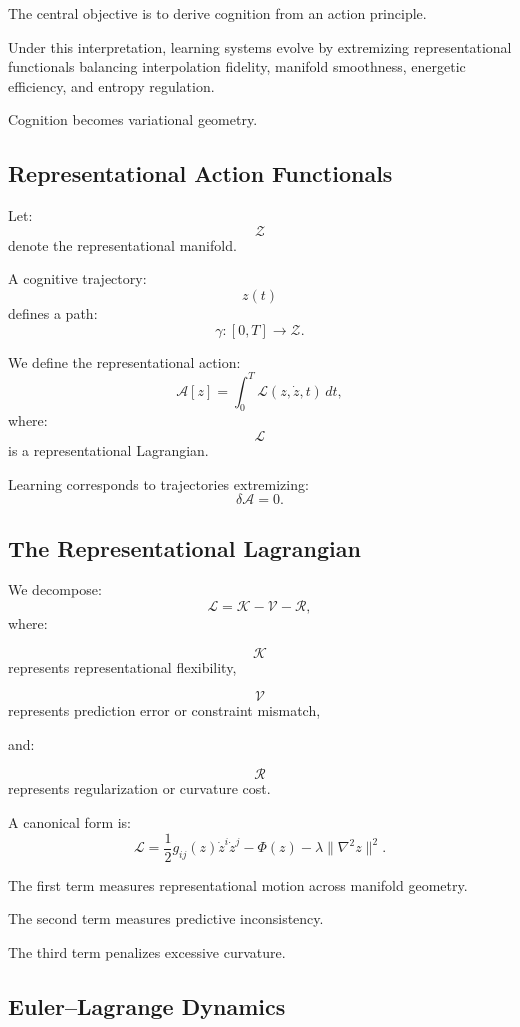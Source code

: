 \documentclass[12pt,a4paper]{article}
\begin{document}
The central objective is to derive cognition from an action principle.

Under this interpretation, learning systems evolve by extremizing representational functionals balancing interpolation fidelity, manifold smoothness, energetic efficiency, and entropy regulation.

Cognition becomes variational geometry.

\subsection{Representational Action Functionals}

Let:
\[
\mathcal{Z}
\]
denote the representational manifold.

A cognitive trajectory:
\[
z(t)
\]
defines a path:
\[
\gamma :
[0,T]
\rightarrow
\mathcal{Z}.
\]

We define the representational action:
\[
\mathcal{A}[z]
=
\int_0^T
\mathcal{L}(z,\dot{z},t)
\,dt,
\]
where:
\[
\mathcal{L}
\]
is a representational Lagrangian.

Learning corresponds to trajectories extremizing:
\[
\delta \mathcal{A}=0.
\]

\subsection{The Representational Lagrangian}

We decompose:
\[
\mathcal{L}
=
\mathcal{K}
-
\mathcal{V}
-
\mathcal{R},
\]
where:

\[
\mathcal{K}
\]
represents representational flexibility,

\[
\mathcal{V}
\]
represents prediction error or constraint mismatch,

and:

\[
\mathcal{R}
\]
represents regularization or curvature cost.

A canonical form is:
\[
\mathcal{L}
=
\frac{1}{2}
g_{ij}(z)
\dot{z}^i
\dot{z}^j
-
\Phi(z)
-
\lambda
\|\nabla^2 z\|^2.
\]

The first term measures representational motion across manifold geometry.

The second term measures predictive inconsistency.

The third term penalizes excessive curvature.

\subsection{Euler--Lagrange Dynamics}
\end{document}
